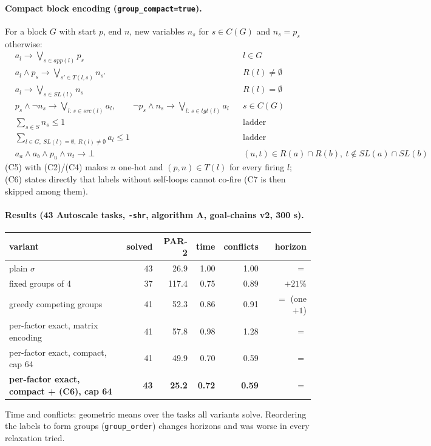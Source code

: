 \documentclass[11pt,a4paper]{article}
\newcommand{\lab}[1]{a_{#1}}            %
\newcommand{\SL}{\mathit{SL}}
\newcommand{\R}{R}
\newcommand{\src}{\mathit{src}}
\newcommand{\tgt}{\mathit{tgt}}
\newcommand{\app}{\mathit{app}}
\begin{document}
\paragraph{Compact block encoding (\texttt{group\_compact=true}).} For a block $G$ with start
$p$, end $n$, new variables $n_s$ for $s \in C(G)$ and $n_s = p_s$ otherwise:
\begin{align}
  &\lab{l} \to \textstyle\bigvee_{s \in \app(l)} p_s && l \in G \tag{C1}\\
  &\lab{l} \wedge p_s \to \textstyle\bigvee_{s' \in T(l,s)} n_{s'} && \R(l) \neq \emptyset \tag{C2}\\
  &\lab{l} \to \textstyle\bigvee_{s \in \SL(l)} n_s && \R(l) = \emptyset \tag{C3}\\
  &p_s \wedge \neg n_s \to \textstyle\bigvee_{l:\, s \in \src(l)} \lab{l},\qquad
   \neg p_s \wedge n_s \to \textstyle\bigvee_{l:\, s \in \tgt(l)} \lab{l} && s \in C(G) \tag{C4}\\
  &\textstyle\sum_{s \in S} n_s \le 1 && \text{ladder} \tag{C5}\\
  &\textstyle\sum_{l \in G,\ \SL(l) = \emptyset,\ \R(l) \neq \emptyset} \lab{l} \le 1 && \text{ladder} \tag{C6}\\
  &\lab{a} \wedge \lab{b} \wedge p_u \wedge n_t \to \bot && (u,t) \in \R(a) \cap \R(b),\ t \notin \SL(a) \cap \SL(b) \tag{C7}
\end{align}
(C5) with (C2)/(C4) makes $n$ one-hot and $(p,n) \in T(l)$ for every firing $l$; (C6) states
directly that labels without self-loops cannot co-fire (C7 is then skipped among them).

\paragraph{Results (43 Autoscale tasks, \texttt{-shr}, algorithm A, goal-chains v2, 300 s).}
\begin{center}
{\small
\begin{tabular}{@{}lrrrrr@{}}
  \toprule
  variant & solved & PAR-2 & time & conflicts & horizon \\
  \midrule
  plain $\sigma$ & 43 & 26.9 & 1.00 & 1.00 & $=$ \\
  fixed groups of 4 & 37 & 117.4 & 0.75 & 0.89 & $+21\%$ \\
  greedy competing groups & 41 & 52.3 & 0.86 & 0.91 & $=$ (one $+1$) \\
  per-factor exact, matrix encoding & 41 & 57.8 & 0.98 & 1.28 & $=$ \\
  per-factor exact, compact, cap 64 & 41 & 49.9 & 0.70 & 0.59 & $=$ \\
  \textbf{per-factor exact, compact + (C6), cap 64} & \textbf{43} & \textbf{25.2} & \textbf{0.72} & \textbf{0.59} & $=$ \\
  \bottomrule
\end{tabular}}
\end{center}
Time and conflicts: geometric means over the tasks all variants solve. Reordering the labels to form
groups (\texttt{group\_order}) changes horizons and was worse in every relaxation tried.
\end{document}
